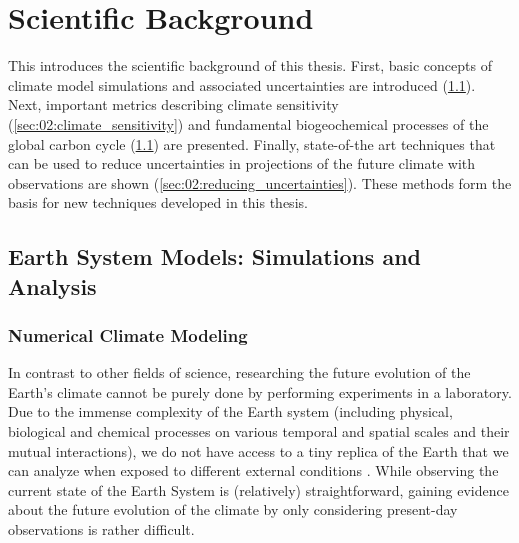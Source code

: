 


\chapter{Scientific Background}
\label{ch:02:scientific_background}

This  introduces the scientific
background of this thesis. First, basic concepts of climate model simulations
and associated uncertainties are introduced (\cref{sec:02:esms}). Next,
important metrics describing climate sensitivity
(\cref{sec:02:climate_sensitivity}) and fundamental biogeochemical processes of
the global carbon cycle (\cref{sec:02:esms}) are presented. Finally,
state-of-the art techniques that can be used to reduce uncertainties in
projections of the future climate with observations are shown
(\cref{sec:02:reducing_uncertainties}). These methods form the basis for new
techniques developed in this thesis.


\section{Earth System Models: Simulations and Analysis}
\label{sec:02:esms}


\subsection{Numerical Climate Modeling}
\label{subsec:02:numerical_climate_modeling}

In contrast to other fields of science, researching the future evolution of the
Earth's climate cannot be purely done by performing experiments in a
laboratory. Due to the immense complexity of the Earth system (including
physical, biological and chemical processes on various temporal and spatial
scales and their mutual interactions), we do not have access to a tiny replica
of the Earth that we can analyze when exposed to different external conditions
\autocite{Flato2011}. While observing the current state of the Earth System is
(relatively) straightforward, gaining evidence about the future evolution of
the climate by only considering present-day observations is rather difficult.

